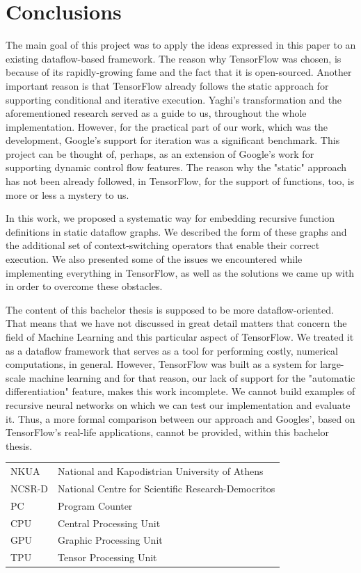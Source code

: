 \documentclass[ack,preface]{dithesis}
\begin{document}
    \section{Conclusions}
The main goal of this project was to apply the ideas expressed in this \cite{Rondogiannis:1997} paper to an existing dataflow-based framework. The reason why TensorFlow was chosen, is because of its rapidly-growing fame and the fact that it is open-sourced. Another important reason is that TensorFlow already follows the static approach for supporting conditional and iterative execution. Yaghi's transformation and the aforementioned research  served as a guide to us, throughout the whole implementation.  However, for the practical part of our work, which was the development,  Google's support for iteration was a significant benchmark. This project can be thought of, perhaps, as an extension of Google's work for supporting dynamic control flow features. The reason why the "static" approach has not been already followed, in TensorFlow, for the support of functions, too,  is more or less a mystery to us.

In this work,  we proposed a systematic way for embedding recursive function definitions in static dataflow graphs. We described the form of these graphs and the additional set of context-switching operators that enable their correct execution. We also presented some of the issues we encountered while implementing everything in TensorFlow, as well as the solutions we came up with in order to overcome these obstacles.

The content of this bachelor thesis is supposed to be more dataflow-oriented. That means that we have not discussed in great detail matters that concern the field of  Machine Learning and this particular aspect of TensorFlow. We treated it as a dataflow framework that serves as a tool for performing  costly, numerical computations, in general. However, TensorFlow was  built as a system for large-scale machine learning and for that reason, our lack of support for the "automatic differentiation" feature, makes this work incomplete. We cannot build examples of recursive neural networks on which we can test our implementation and evaluate it.  Thus, a more formal comparison between our approach and Googles', based on TensorFlow's real-life applications, cannot be provided, within this bachelor thesis.


\backmatter

\abbreviations
\begin{center}
	\renewcommand{\arraystretch}{1.5}
	\begin{longtable}{ l @{\qquad} l }
	\toprule
	NKUA    & National and Kapodistrian University of Athens\\
	NCSR-D & National Centre for Scientific Research-Democritos \\
	PC & Program Counter \\
	CPU & Central Processing Unit\\
	GPU & Graphic Processing Unit\\
	TPU & Tensor Processing Unit\\
	\bottomrule
	\end{longtable}
\end{center}
\end{document}
